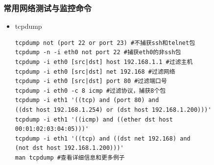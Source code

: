\documentclass[xcolor=svgnames,presentation]{beamer}
\begin{document}
\begin{frame}[fragile]
\frametitle{常用网络测试与监控命令}
\label{sec-2-2}
\begin{itemize}

\item tcpdump\\
\label{sec-2-2-1}%
\begin{verbatim}
tcpdump not (port 22 or port 23) #不捕获ssh和telnet包
tcpdump -n -i eth0 not port 22 #捕获eth0的非ssh包
tcpdump -i eth0 [src|dst] host 192.168.1.1 #过滤主机
tcpdump -i eth0 [src|dst] net 192.168 #过滤网络
tcpdump -i eth0 [src|dst] port 80 #过滤端口号
tcpdump -i eth0 -c 8 icmp #过滤协议，捕获8个包
tcpdump -i eth1 '((tcp) and (port 80) and 
((dst host 192.168.1.254) or (dst host 192.168.1.200)))'
tcpdump -i eth1 '((icmp) and ((ether dst host 
00:01:02:03:04:05)))'
tcpdump -i eth1 '((tcp) and ((dst net 192.168) and 
(not dst host 192.168.1.200)))'
man tcpdump #查看详细信息和更多例子
\end{verbatim}

\end{itemize} %
\end{frame}
\end{document}
